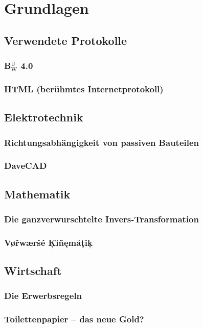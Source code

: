 \chapter{Grundlagen}
	
	
	\section{Verwendete Protokolle}
		\subsection{\texorpdfstring{B$^\text{U}_\text{W}$ 4.0}{BUW 4.0}}
			\blindtext
		\subsection[HTML]{HTML (berühmtes Internetprotokoll)}
			\blindtext
		
		
	\section{Elektrotechnik}
		\subsection{Richtungsabhängigkeit von passiven Bauteilen}
			\blindtext
		\subsection{DaveCAD}
			\blindtext
		
	\section{Mathematik}
		\subsection{Die ganzverwurschtelte Invers-Transformation}
			\blindtext
		\subsection{V\o{}\v{r}w\ae{}r\v{s}\'{e} \c{K}\"{\i}\~{n}\k{e}m\aa{}\c{t}i\c{k}}
			\blindtext
		
	\section{Wirtschaft}
		\subsection{Die Erwerbsregeln}
			\blindtext
			
		\subsection{Toilettenpapier -- das neue Gold?}
			\blindtext

		